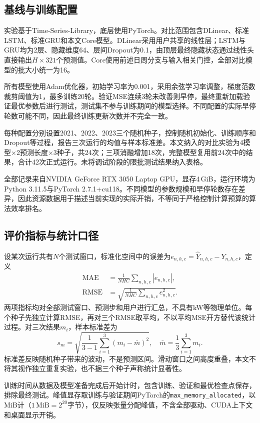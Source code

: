 \documentclass[UTF8,a4paper,zihao=5,fontset=windows]{ctexart}
\begin{document}
\subsection{基线与训练配置}
实验基于Time-Series-Library\cite{tslcode}，底层使用PyTorch\cite{paszke2019pytorch}。对比范围包含DLinear、标准LSTM、标准GRU和本文Core模型。DLinear采用用户共享的线性层；LSTM与GRU均为2层、隐藏维度64、层间Dropout为0.1，由顶层最终隐藏状态通过线性头直接输出$H\times321$个预测值。Core使用前述日周分支与输入相关门控，全部对比模型的批大小统一为16。

所有模型使用Adam优化器\cite{kingma2015adam}，初始学习率为0.001，采用余弦学习率调整，梯度范数裁剪阈值为1，最多训练20轮。验证MSE连续3轮未改善则早停，最终重新加载验证最优参数后进行测试，测试集不参与训练期间的模型选择。不同配置的实际早停轮数可能不同，因此最终训练更新次数并不完全一致。

每种配置分别设置2021、2022、2023三个随机种子，控制随机初始化、训练顺序和Dropout等过程，报告三次运行的均值与样本标准差。本文纳入的对比实验为4模型$\times$2预测长度$\times$3种子，共24次；三项消融增加18次，完整模型复用前24次中的结果，合计42次正式运行。未将调试阶段的限批测试结果纳入表格。

全部记录来自NVIDIA GeForce RTX 3050 Laptop GPU，显存4\,GiB，运行环境为Python 3.11.5与PyTorch 2.7.1+cu118。不同模型的参数规模和早停轮数存在差异，因此资源数据用于描述当前实现的实际开销，不等同于严格控制计算预算的算法效率排名。

\subsection{评价指标与统计口径}
设某次运行共有$N$个测试窗口，标准化空间中的误差为$e_{n,h,c}=\widehat Y_{n,h,c}-Y_{n,h,c}$，定义
\begin{align}
\operatorname{MAE}&=\frac{1}{NHC}\sum_{n,h,c}|e_{n,h,c}|,\\
\operatorname{RMSE}&=\sqrt{\frac{1}{NHC}\sum_{n,h,c}e_{n,h,c}^2}.
\end{align}
两项指标均对全部测试窗口、预测步和用户进行汇总，不具有kW等物理单位。每个种子先独立计算RMSE，再对三个RMSE取平均，不以平均MSE开方替代该统计过程。对三次结果$m_i$，样本标准差为
\begin{equation}
s_m=\sqrt{\frac{1}{3-1}\sum_{i=1}^{3}(m_i-\bar m)^2},
\quad \bar m=\frac{1}{3}\sum_{i=1}^{3}m_i.
\end{equation}
标准差反映随机种子带来的波动，不是预测区间。滑动窗口之间高度重叠，本文不将其视作独立重复实验，也不据三个种子声称统计显著性。

训练时间从数据及模型准备完成后开始计时，包含训练、验证和最优检查点保存，排除最终测试。峰值显存取训练与验证期间PyTorch的\nolinkurl{max_memory_allocated}，以MiB计（$1\,\mathrm{MiB}=2^{20}$字节），仅反映张量分配峰值，不含全部驱动、CUDA上下文和桌面显示开销。
\end{document}
